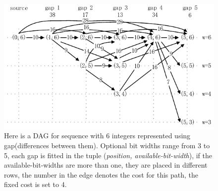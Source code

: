 \documentclass[runningheads,a4paper]{llncs}
\begin{document}

\begin{figure}
	\centering
	\includegraphics[width=0.9\linewidth]{sssp}
	\caption[sssp]{Here is a DAG for sequence with 6 integers represented using gap(differences between them). Optional bit widths range from 3 to 5, each gap is fitted in the tuple (\textit{position, available-bit-width}), if the available-bit-widths are more than one, they are placed in different rows, the number in the edge denotes the cost for this path, the fixed cost is set to 4.}
	\label{fig:sssp}
\end{figure}
\end{document}
